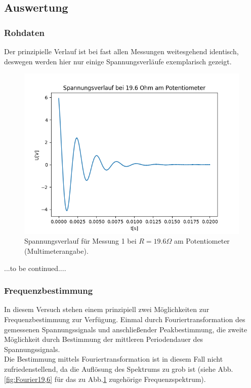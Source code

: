 \documentclass[12pt,a4paper]{article}
\begin{document}
\subsection{Auswertung}
\subsubsection{Rohdaten}
Der prinzipielle Verlauf ist bei fast allen Messungen weitesgehend identisch, deswegen werden hier nur einige Spannungsverläufe exemplarisch gezeigt.

\begin{figure}
\begin{center}
\includegraphics[scale=0.75]{Bilder/Spannungsverlauf19,6Ohm}
\end{center}
\caption[Spannungsverlauf]{Spannungsverlauf für Messung 1 bei $R=19.6 \Omega$ am Potentiometer (Multimeterangabe).}
\label{fig:Spannung19,6}
\end{figure}

...to be continued....

\subsubsection{Frequenzbestimmung}
In diesem Versuch stehen einem prinzipiell zwei Möglichkeiten zur Frequenzbestimmung zur Verfügung.
Einmal durch Fouriertransformation des gemessenen Spannungssignals und anschließender Peakbestimmung, die zweite Möglichkeit durch Bestimmung der mittleren Periodendauer des Spannungssignals.\\

Die Bestimmung mittels Fouriertransformation ist in diesem Fall nicht zufriedenstellend, da die Auflösung des Spektrums zu grob ist (siehe Abb.\ref{fig:Fourier19,6} für das zu Abb.\ref{fig:Spannung19,6} zugehörige Frequenzspektrum).\\
\end{document}
